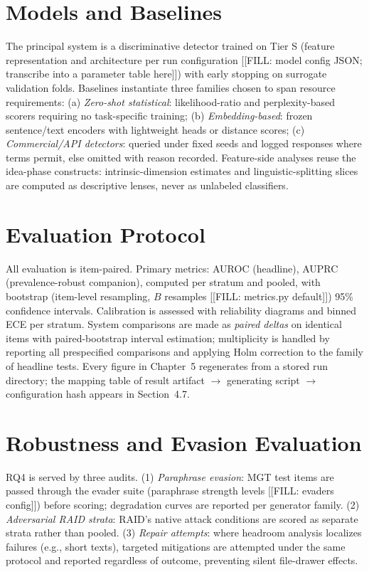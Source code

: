 \section{Models and Baselines}
The principal system is a discriminative detector trained on Tier S
(feature representation and architecture per run configuration
[[FILL: model config JSON; transcribe into a parameter table here]])
with early stopping on surrogate validation folds. Baselines instantiate
three families chosen to span resource requirements:
(a) \emph{Zero-shot statistical}: likelihood-ratio and perplexity-based
scorers requiring no task-specific training;
(b) \emph{Embedding-based}: frozen sentence/text encoders with lightweight
heads or distance scores;
(c) \emph{Commercial/API detectors}: queried under fixed seeds and logged
responses where terms permit, else omitted with reason recorded.
Feature-side analyses reuse the idea-phase constructs: intrinsic-dimension
estimates and linguistic-splitting slices are computed as descriptive
lenses, never as unlabeled classifiers.

\section{Evaluation Protocol}
All evaluation is item-paired. Primary metrics: AUROC (headline), AUPRC
(prevalence-robust companion), computed per stratum and pooled, with
bootstrap (item-level resampling, $B$ resamples [[FILL: metrics.py
default]]) 95\% confidence intervals. Calibration is assessed with
reliability diagrams and binned ECE per stratum. System comparisons are
made as \emph{paired deltas} on identical items with paired-bootstrap
interval estimation; multiplicity is handled by reporting all prespecified
comparisons and applying Holm correction to the family of headline tests.
Every figure in Chapter~5 regenerates from a stored run directory; the
mapping table of result artifact $\rightarrow$ generating script $\rightarrow$
configuration hash appears in Section~4.7.

\section{Robustness and Evasion Evaluation}
RQ4 is served by three audits. (1) \emph{Paraphrase evasion}: MGT test
items are passed through the evader suite (paraphrase strength levels
[[FILL: evaders config]]) before scoring; degradation curves are reported
per generator family. (2) \emph{Adversarial RAID strata}: RAID's native
attack conditions are scored as separate strata rather than pooled.
(3) \emph{Repair attempts}: where headroom analysis localizes failures
(e.g., short texts), targeted mitigations are attempted under the same
protocol and reported regardless of outcome, preventing silent
file-drawer effects.

